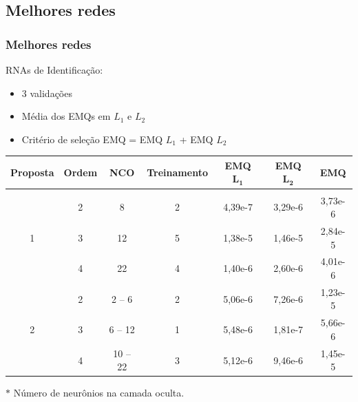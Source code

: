 \documentclass{beamer}
\begin{document}
\subsection{Melhores redes}
\begin{frame}
    \frametitle{Melhores redes}

    RNAs de Identificação:

\begin{itemize}
    \item 3 validações
    \item Média dos EMQs em $L_1$ e $L_2$
    \item Critério de seleção EMQ = EMQ $L_1$ + EMQ $L_2$
\end{itemize}

\begin{table}[htb]
\footnotesize
\centering
\begin{threeparttable}
\begin{tabular}{|c|c|c|c|c|c|c|}
\hline
{\bf Proposta} & 
{\bf Ordem} & 
{\bf NCO\tnote{$*$}} & 
{\bf Treinamento} &
{\bf EMQ $\mathbf{L_1}$} & 
{\bf EMQ $\mathbf{L_2}$} & 
{\bf EMQ}\\
\hline
\hhline\\
\multirow{3}{*}{1} &
\cellcolor[gray]{0.85}2 &
\cellcolor[gray]{0.85}8 &
\cellcolor[gray]{0.85}2 &
\cellcolor[gray]{0.85}4,39e-7 &
\cellcolor[gray]{0.85}3,29e-6 &
\cellcolor[gray]{0.85}3,73e-6\\
\hhline{~------}
&3 & 12 & 5 & 1,38e-5 & 1,46e-5 & 2,84e-5\\
\cline{2-7}
&4 & 22 & 4 & 1,40e-6 & 2,60e-6 & 4,01e-6\\
\hline
\multirow{3}{*}{2} & 2 & 2 -- 6 & 2 & 5,06e-6 & 7,26e-6 & 1,23e-5\\
\cline{2-7}
& 3 & 6 -- 12 & 1 & 5,48e-6 & 1,81e-7 & 5,66e-6\\
\cline{2-7}
& 4 & 10 -- 22 & 3 & 5,12e-6 & 9,46e-6 & 1,45e-5\\
\hline
\end{tabular}
\begin{tablenotes}
\item [$*$] Número de neurônios na camada oculta.
\end{tablenotes}
\end{threeparttable}
\end{table}
\end{frame}
\end{document}

